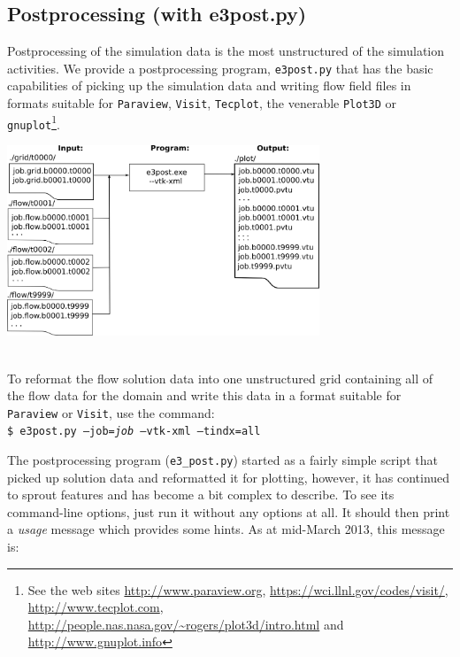 \subsection{Postprocessing (with e3post.py)} 
\label{sec:e3post}
%
Postprocessing of the simulation data is the most unstructured of the simulation activities.
We provide a postprocessing program, \texttt{e3post.py} that has the basic capabilities of picking up 
the simulation data and writing flow field files in formats suitable for 
\texttt{Paraview}, \texttt{Visit}, \texttt{Tecplot}, the venerable \texttt{Plot3D} or 
\texttt{gnuplot}\footnote{See the web sites  \url{http://www.paraview.org}, \url{https://wci.llnl.gov/codes/visit/},
\url{http://www.tecplot.com}, \url{http://people.nas.nasa.gov/\~rogers/plot3d/intro.html} and \url{http://www.gnuplot.info}}.
\vspace{0.25cm} \\
\centerline{\includegraphics[width=0.7\textwidth]{figs/post-process.png}}\\

\medskip
To reformat the flow solution data into one unstructured grid
containing all of the flow data for the domain and write this data in a format suitable
for \texttt{Paraview} or \texttt{Visit}, use the command:\\
\texttt{\$ e3post.py --job=\textit{job} --vtk-xml --tindx=all}\\ 

\medskip
The postprocessing program (\texttt{e3\_post.py}) started as a fairly simple script that picked up solution data
and reformatted it for plotting, however, it has continued to sprout features and has become a bit 
complex to describe.
To see its command-line options, just run it without any options at all.
It should then print a \textit{usage} message which provides some hints.
As at mid-March 2013, this message is:

